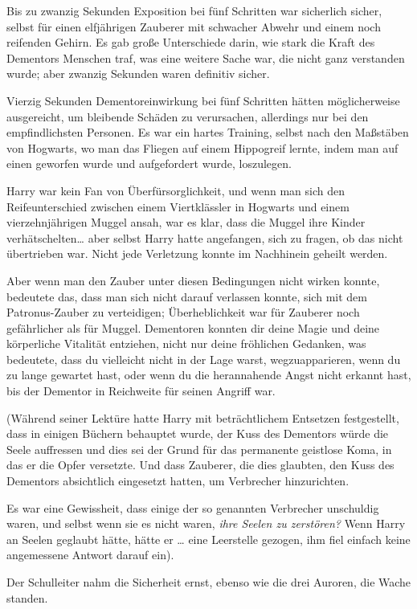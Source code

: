 {Bis zu zwanzig Sekunden Exposition bei fünf Schritten war sicherlich sicher, selbst für einen elfjährigen Zauberer mit schwacher Abwehr und einem noch reifenden Gehirn. Es gab große Unterschiede darin, wie stark die Kraft des Dementors Menschen traf, was eine weitere Sache war, die nicht ganz verstanden wurde; aber zwanzig Sekunden waren definitiv sicher.

Vierzig Sekunden Dementoreinwirkung bei fünf Schritten hätten möglicherweise ausgereicht, um bleibende Schäden zu verursachen, allerdings nur bei den empfindlichsten Personen. Es war ein hartes Training, selbst nach den Maßstäben von Hogwarts, wo man das Fliegen auf einem Hippogreif lernte, indem man auf einen geworfen wurde und aufgefordert wurde, loszulegen.

Harry war kein Fan von Überfürsorglichkeit, und wenn man sich den Reifeunterschied zwischen einem Viertklässler in Hogwarts und einem vierzehnjährigen Muggel ansah, war es klar, dass die Muggel ihre Kinder verhätschelten… aber selbst Harry hatte angefangen, sich zu fragen, ob das nicht übertrieben war. Nicht jede Verletzung konnte im Nachhinein geheilt werden.

Aber wenn man den Zauber unter diesen Bedingungen nicht wirken konnte, bedeutete das, dass man sich nicht darauf verlassen konnte, sich mit dem Patronus-Zauber zu verteidigen; Überheblichkeit war für Zauberer noch gefährlicher als für Muggel. Dementoren konnten dir deine Magie und deine körperliche Vitalität entziehen, nicht nur deine fröhlichen Gedanken, was bedeutete, dass du vielleicht nicht in der Lage warst, wegzuapparieren, wenn du zu lange gewartet hast, oder wenn du die herannahende Angst nicht erkannt hast, bis der Dementor in Reichweite für seinen Angriff war.

(Während seiner Lektüre hatte Harry mit beträchtlichem Entsetzen festgestellt, dass in einigen Büchern behauptet wurde, der Kuss des Dementors würde die Seele auffressen und dies sei der Grund für das permanente geistlose Koma, in das er die Opfer versetzte. Und dass Zauberer, die dies glaubten, den Kuss des Dementors absichtlich eingesetzt hatten, um Verbrecher hinzurichten.

Es war eine Gewissheit, dass einige der so genannten Verbrecher unschuldig waren, und selbst wenn sie es nicht waren, \emph{ihre Seelen zu zerstören?} Wenn Harry an Seelen geglaubt hätte, hätte er … eine Leerstelle gezogen, ihm fiel einfach keine angemessene Antwort darauf ein).

Der Schulleiter nahm die Sicherheit ernst, ebenso wie die drei Auroren, die Wache standen.

}
